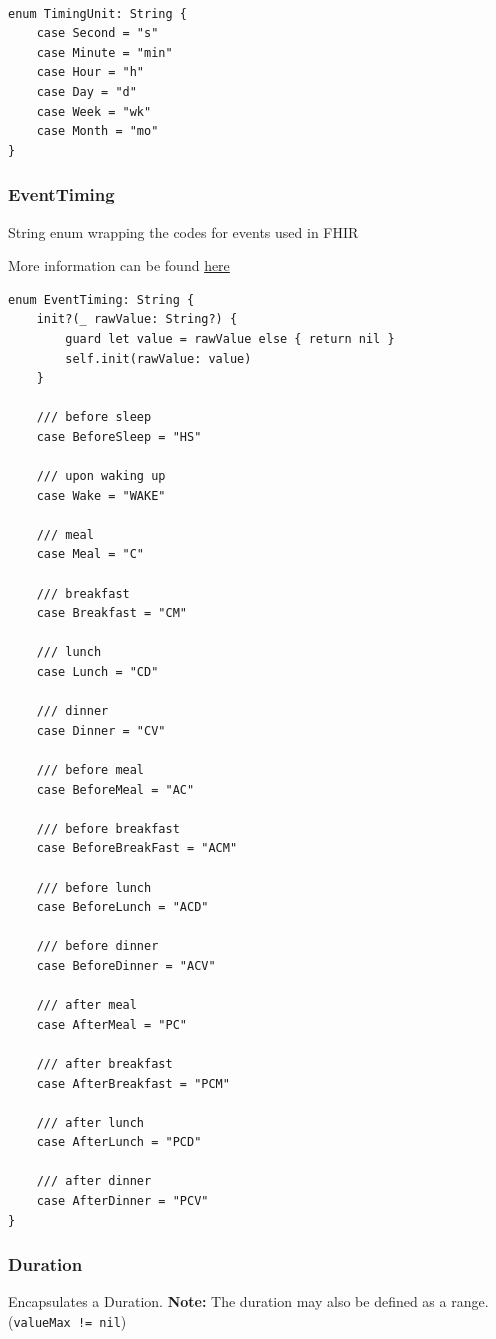 \documentclass{article}
\begin{document}
\begin{verbatim}

enum TimingUnit: String {
    case Second = "s"
    case Minute = "min"
    case Hour = "h"
    case Day = "d"
    case Week = "wk"
    case Month = "mo"
}
\end{verbatim}

\subsubsection{EventTiming}\label{eventtiming}
String enum wrapping the codes for events used in FHIR

More information can be found
\href{http://hl7.org/fhir/v3/TimingEvent}{here}

\begin{verbatim}
enum EventTiming: String {
    init?(_ rawValue: String?) {
        guard let value = rawValue else { return nil }
        self.init(rawValue: value)
    }

    /// before sleep
    case BeforeSleep = "HS"

    /// upon waking up
    case Wake = "WAKE"

    /// meal
    case Meal = "C"

    /// breakfast
    case Breakfast = "CM"

    /// lunch
    case Lunch = "CD"

    /// dinner
    case Dinner = "CV"

    /// before meal
    case BeforeMeal = "AC"

    /// before breakfast
    case BeforeBreakFast = "ACM"

    /// before lunch
    case BeforeLunch = "ACD"

    /// before dinner
    case BeforeDinner = "ACV"

    /// after meal
    case AfterMeal = "PC"

    /// after breakfast
    case AfterBreakfast = "PCM"

    /// after lunch
    case AfterLunch = "PCD"

    /// after dinner
    case AfterDinner = "PCV"
}
\end{verbatim}

\subsubsection{Duration}\label{duration}
Encapsulates a Duration. \textbf{Note:} The duration may
also be defined as a range. (\texttt{valueMax\ !=\ nil})
\end{document}
